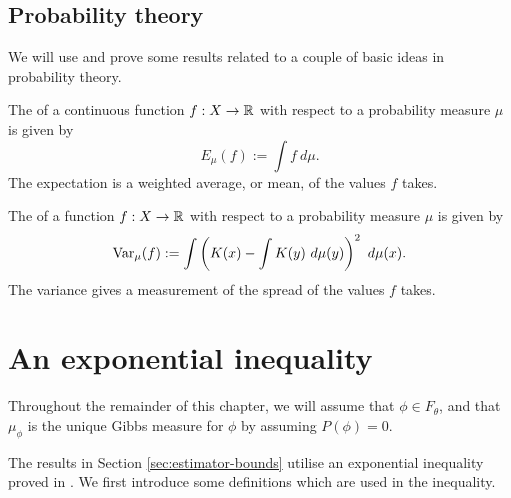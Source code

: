 \subsection{Probability theory}
We will use and prove some results related to a couple of basic ideas in probability theory.
\begin{definition}
	The  of a continuous function $f : X \to \mathbb{R}$ with respect to a probability measure $\mu$ is given by
	\[
		E_\mu(f) := \int{f\ d\mu}.
	\]
	The expectation is a weighted average, or mean, of the values $f$ takes.~\cite[p127]{gray:probability}
\end{definition}

\begin{definition}
	The  of a function $f : X \to \mathbb{R}$ with respect to a probability measure $\mu$ is given by
	\[
		\operatorname{Var}_{\mu}(f) := \int{\left(K(x) - \int{K(y)\ d\mu(y)}\right)^2\ d\mu(x)}.
	\]
	The variance gives a measurement of the spread of the values $f$ takes.
\end{definition}

\section{An exponential inequality}
Throughout the remainder of this chapter, we will assume that $\phi \in F_\theta$, and that $\mu_\phi$ is the unique Gibbs measure for $\phi$ by assuming $P(\phi) = 0$.

The results in Section \ref{sec:estimator-bounds} utilise an exponential inequality proved in \cite{collet-martinez-schmitt:exp-ineq}. We first introduce some definitions which are used in the inequality.

